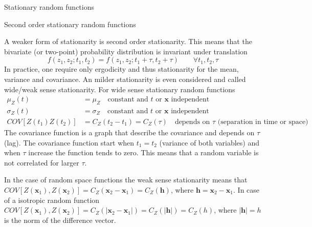 \documentclass[8pt]{beamer}
\renewcommand{\emph}[1]{\textcolor{myorange}{#1}}
\begin{document}
 \begin{frame}{Stationary random functions}
     \begin{block}{Second order stationary random functions}
    \end{block}
    A weaker form of \emph{stationarity} is second order \emph{stationarity}. This means that  the bivariate (or two-point) \emph{probability distribution} is invariant under translation 
    \[
    f(z_1, z_2; t_1, t_2) = f(z_1, z_2; t_1 + \tau, t_2+\tau) \quad \quad \forall t_1 , t_2, \tau 
\]
In practice, one require only \emph{ergodicity} and thus \emph{stationarity} for the \emph{mean}, \emph{variance} and \emph{covariance}. An \emph{milder stationarity} is even considered and called \alert{wide/weak sense stationarity}. For \emph{wide sense stationary random functions}
\begin{align*}
    \mu_Z (t) &= \mu_Z \quad \text{constant and $t$ or $\mathbf{x}$ independent}\\
    \sigma_Z (t) &= \sigma_Z \quad \text{constant and $t$ or $\mathbf{x}$ independent}\\
    COV[Z(t_1) Z(t_2)] &= C_Z(t_2 - t_1) = C_Z (\tau) \quad \text{depends on $\tau$ (separation in time or space)}
\end{align*}
The \alert{covariance function} is a graph that describe the covariance and depends on $\tau$ (\alert{lag}). The covariance function start when $t_1 = t_2$ (variance of both variables) and when $\tau$ increase the function tends to zero. This means that a random variable is not correlated for larger $\tau$.

In the case of \emph{random space functions} the \emph{weak sense stationarity} means that $COV [Z(\mathbf{x}_1), Z(\mathbf{x}_2)] = C_Z (\mathbf{x}_2 - \mathbf{x}_1) = C_Z (\mathbf{h})$, where $\mathbf{h} = \mathbf{x}_2 - \mathbf{x}_1$. In case of a \emph{isotropic} random function $COV [Z(\mathbf{x}_1), Z(\mathbf{x}_2)] = C_Z (|\mathbf{x}_2 - \mathbf{x}_1|) = C_Z (\mathbf{|h|}) = C_Z (h)$, where $|\mathbf{h}|=h$ is the \emph{norm} of the difference vector. 
\end{frame}
 
\end{document}
